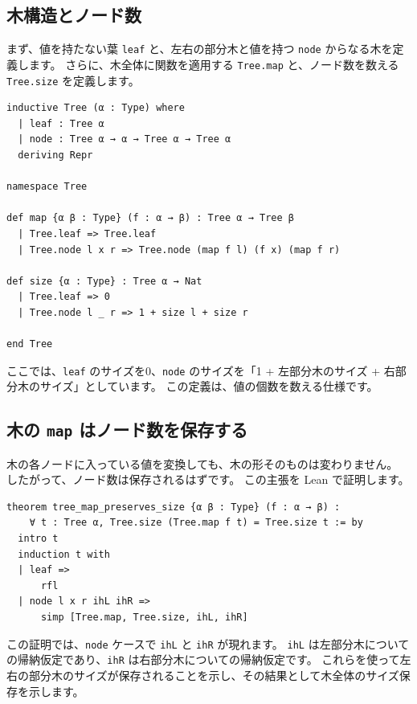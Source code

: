 \subsection{木構造とノード数}

まず、値を持たない葉 \texttt{leaf} と、左右の部分木と値を持つ \texttt{node} からなる木を定義します。
さらに、木全体に関数を適用する \texttt{Tree.map} と、ノード数を数える \texttt{Tree.size} を定義します。

\begin{listing}[htbp]
\begin{verbatim}
inductive Tree (α : Type) where
  | leaf : Tree α
  | node : Tree α → α → Tree α → Tree α
  deriving Repr

namespace Tree

def map {α β : Type} (f : α → β) : Tree α → Tree β
  | Tree.leaf => Tree.leaf
  | Tree.node l x r => Tree.node (map f l) (f x) (map f r)

def size {α : Type} : Tree α → Nat
  | Tree.leaf => 0
  | Tree.node l _ r => 1 + size l + size r

end Tree
\end{verbatim}
\caption{\texttt{Tree} と \texttt{Tree.size}}
\label{lst:induction-tree-def}
\end{listing}

ここでは、\texttt{leaf} のサイズを0、\texttt{node} のサイズを「1 + 左部分木のサイズ + 右部分木のサイズ」としています。
この定義は、値の個数を数える仕様です。

\subsection{木の \texttt{map} はノード数を保存する}

木の各ノードに入っている値を変換しても、木の形そのものは変わりません。
したがって、ノード数は保存されるはずです。
この主張を Lean で証明します。

\begin{listing}[htbp]
\begin{verbatim}
theorem tree_map_preserves_size {α β : Type} (f : α → β) :
    ∀ t : Tree α, Tree.size (Tree.map f t) = Tree.size t := by
  intro t
  induction t with
  | leaf =>
      rfl
  | node l x r ihL ihR =>
      simp [Tree.map, Tree.size, ihL, ihR]
\end{verbatim}
\caption{\texttt{tree\_map\_preserves\_size}}
\label{lst:induction-tree-size}
\end{listing}

この証明では、\texttt{node} ケースで \texttt{ihL} と \texttt{ihR} が現れます。
\texttt{ihL} は左部分木についての帰納仮定であり、\texttt{ihR} は右部分木についての帰納仮定です。
これらを使って左右の部分木のサイズが保存されることを示し、その結果として木全体のサイズ保存を示します。

